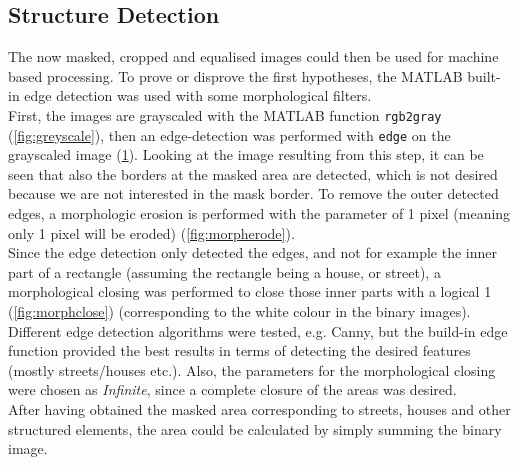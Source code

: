 
\subsection{Structure Detection}
The now masked, cropped and equalised images could then be used for machine based processing. To prove or disprove the first hypotheses, the MATLAB built-in edge detection was used with some morphological filters. \\
First, the images are grayscaled with the MATLAB function \texttt{rgb2gray} (\cref{fig:greyscale}), then an edge-detection was performed with \texttt{edge} on the grayscaled image (\cref{fig:edge_detect}). Looking at the image resulting from this step, it can be seen that also the borders at the masked area are detected, which is not desired because we are not interested in the mask border. To remove the outer detected edges, a morphologic erosion is performed with the parameter of 1 pixel (meaning only 1 pixel will be eroded) (\cref{fig:morpherode}). \\
Since the edge detection only detected the edges, and not for example the inner part of a rectangle (assuming the rectangle being a house, or street), a morphological closing was performed to close those inner parts with a logical 1 (\cref{fig:morphclose}) (corresponding to the white colour in the binary images). Different edge detection algorithms were tested, e.g. Canny, but the build-in edge function provided the best results in terms of detecting the desired features (mostly streets/houses etc.). Also, the parameters for the morphological closing were chosen as \textit{Infinite}, since a complete closure of the  areas was desired.\\
After having obtained the masked area corresponding to streets, houses and other structured elements, the area could be calculated by simply summing the binary image.


\begin{figure}[h!]
\centering
\begin{minipage}{.5\textwidth}
	\centering
	\label{fig:greyscale}
\end{minipage}%
\begin{minipage}{.5\textwidth}
	\centering
	\label{fig:edge_detect}
\end{minipage}
\end{figure}

